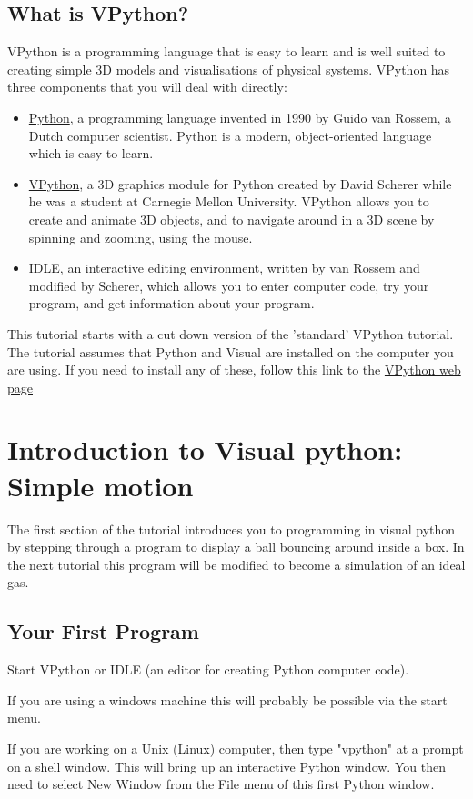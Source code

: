 \documentclass[12pt]{article}
\begin{document}
\subsection{What is VPython?}
VPython is a programming language that is easy to learn and is well suited to creating
simple 3D models and visualisations of physical systems.
VPython has three components that you will deal with directly:
\begin{itemize}
 \item{\href{http://www.python.org}{Python}, a programming language invented in 1990 by Guido van Rossem, a Dutch computer
scientist. Python is a modern, object-oriented language which is easy to learn.}
\item{\href{http://www.vpython.org}{VPython}, a 3D graphics module for Python created by David Scherer while he was a student
at Carnegie Mellon University. VPython allows you to create and animate 3D objects, and to
 navigate around in a 3D scene by spinning and zooming, using the mouse.}
\item{IDLE, an interactive editing environment, written by van Rossem and modified by Scherer,
which allows you to enter computer code, try your program, and get information about your program. }
\end{itemize}
This tutorial starts with a cut down version of the 'standard' VPython tutorial.
The tutorial assumes that Python and Visual are installed on the computer you are using.
If you need to install  any of these, follow this link to the
\href{http://www.vpython.org/}{VPython web page}


\section{Introduction to Visual python: Simple motion}
The first section of the tutorial introduces you to programming in visual python by stepping
through a program to display a ball bouncing around inside a box.
In the next tutorial this program will be modified to become a simulation of an ideal gas.

\subsection{Your First Program}
Start VPython or IDLE (an editor for creating Python computer code).

If you are using a windows machine this will probably be possible
via the start menu.

If you are working on a Unix (Linux) computer, then type "vpython"
at a prompt on a shell window. This will bring up an interactive
Python window. You then need to select New Window from the File menu
of this first Python window.
\end{document}
